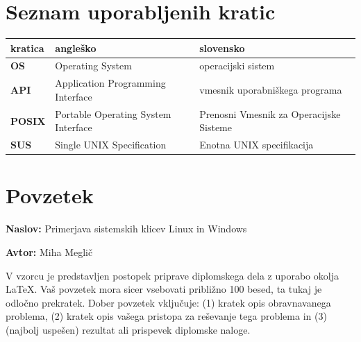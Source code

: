 \documentclass[a4paper,12pt,openright]{book}
\newcommand{\ttitle}{Primerjava sistemskih klicev Linux in Windows}
\newcommand{\tauthor}{Miha Meglič}
\newcommand{\clearemptydoublepage}{\newpage{\pagestyle{empty}\cleardoublepage}}
\begin{document}
\pagestyle{empty}
\def\thepage{}%
\tableofcontents{}


\clearemptydoublepage


\chapter*{Seznam uporabljenih kratic}

\noindent\begin{tabular}{p{}|p{}|p{}}    %
{\bf kratica} & {\bf angleško}                     & {\bf slovensko}                         \\
\hline
{\bf OS}      & Operating System                    & operacijski sistem                      \\
{\bf API}     & Application Programming Interface   & vmesnik uporabniškega programa         \\
{\bf POSIX}   & Portable Operating System Interface & Prenosni Vmesnik za Operacijske Sisteme \\
{\bf SUS}     & Single UNIX Specification           & Enotna UNIX specifikacija               \\
\end{tabular}


\clearemptydoublepage

\chapter*{Povzetek}

\noindent\textbf{Naslov:} \ttitle
\bigskip

\noindent\textbf{Avtor:} \tauthor
\bigskip

\noindent V vzorcu je predstavljen postopek priprave diplomskega dela z uporabo okolja \LaTeX. Vaš povzetek mora sicer vsebovati približno 100 besed, ta tukaj je odločno prekratek.
Dober povzetek vključuje: (1) kratek opis obravnavanega problema, (2) kratek opis vašega pristopa za reševanje tega problema in (3) (najbolj uspešen) rezultat ali prispevek diplomske naloge.

\bigskip
\end{document}
